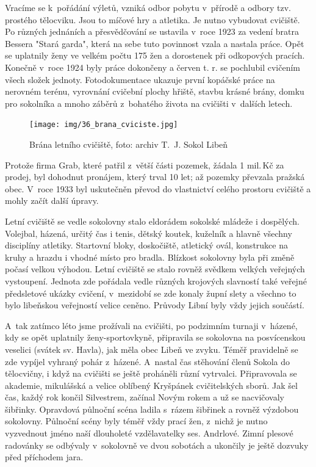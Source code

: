 \documentclass[a5paper, 11pt, twoside]{article}
\begin{document}
Vracíme se k~pořádání výletů, vzniká odbor pobytu v~přírodě a odbory
tzv. prostého tělocviku. Jsou to míčové hry a atletika. Je nutno
vybudovat cvičiště. Po různých jednáních a přesvědčování se ustavila
v~roce 1923 za vedení bratra Bessera "Stará garda", která na sebe tuto
povinnost vzala a nastala práce. Opět se uplatnily ženy ve velkém počtu
175 žen a dorostenek při odkopových pracích. Konečně v~roce 1924 byly
práce dokončeny a červen t. r. se pochlubil cvičením všech složek
jednoty. Fotodokumentace ukazuje první kopáčské práce na nerovném
terénu, vyrovnání cvičební plochy hřiště, stavbu krásné brány, domku pro
sokolníka a mnoho záběrů z~bohatého života na cvičišti v~dalších letech.

\begin{figure}[h!]
  \centering 
  \texttt{[image: img/36\_brana\_cviciste.jpg]}
  \caption*{Brána letního cvičiště, foto: archiv T.~J. Sokol Libeň}
\end{figure}

Protože firma Grab, které patřil z~větší části pozemek, žádala 1 mil.\,Kč
za prodej, byl dohodnut pronájem, který trval 10 let; až pozemky
převzala pražská obec. V~roce 1933 byl uskutečněn převod do vlastnictví
celého prostoru cvičiště a mohly začít další úpravy.

Letní cvičiště se vedle sokolovny stalo eldorádem sokolské mládeže i
dospělých. Volejbal, házená, určitý čas i tenis, dětský koutek, kuželník
a hlavně všechny disciplíny atletiky. Startovní bloky, doskočiště,
atletický ovál, konstrukce na kruhy a hrazdu i vhodné místo pro bradla.
Blízkost sokolovny byla při změně počasí velkou výhodou. Letní cvičiště
se stalo rovněž svědkem velkých veřejných vystoupení. Jednota zde
pořádala vedle různých krojových slavností také veřejné předsletové
ukázky cvičení, v~mezidobí se zde konaly župní slety a všechno to bylo
libeňskou veřejností velice ceněno. Průvody Libní byly vždy jejich
součástí.

A~tak zatímco léto jsme prožívali na cvičišti, po podzimním turnaji
v~házené, kdy se opět uplatnily ženy-sportovkyně, připravila se sokolovna
na posvícenskou veselici (svátek sv. Havla), jak měla obec Libeň ve
zvyku. Téměř pravidelně se zde vypíjel vyhraný pohár z~házené. A~nastal
čas stěhování členů Sokola do tělocvičny, i když na cvičišti se ještě
proháněli různí vytrvalci. Připravovala se akademie, mikulášská a velice
oblíbený Kryšpánek cvičitelských sborů. Jak šel čas, každý rok končil
Silvestrem, začínal Novým rokem a už se nacvičovaly šibřinky. Opravdová
půlnoční scéna ladila s~rázem šibřinek a rovněž výzdobou sokolovny.
Půlnoční scény byly téměř vždy prací žen, z~nichž je nutno vyzvednout
jméno naší dlouholeté vzdělavatelky ses. Andrlové. Zimní plesové
radovánky se odbývaly v~sokolovně ve dvou sobotách a ukončily je ještě
dozvuky před příchodem jara.
\end{document}
